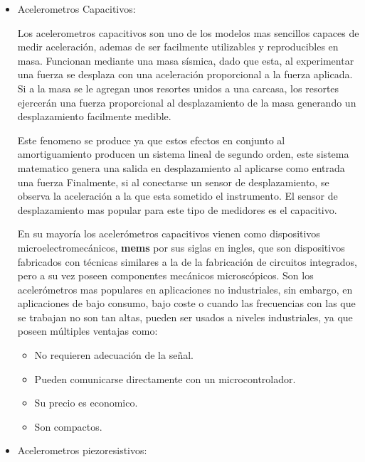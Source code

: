 \begin{itemize}
    \item  Acelerometros Capacitivos:

        Los acelerometros capacitivos son uno de los modelos mas sencillos
        capaces de medir
        aceleración, ademas de ser facilmente utilizables y reproducibles en masa.
        Funcionan mediante una masa sísmica, dado que esta, al  experimentar una fuerza
        se desplaza con una aceleración proporcional a la fuerza aplicada.
        Si a la masa se le agregan unos resortes unidos a una carcasa, los resortes
        ejercerán una fuerza proporcional al desplazamiento de la masa generando un
        desplazamiento facilmente medible.

        Este fenomeno se produce ya que estos efectos en conjunto al
        amortiguamiento producen un sistema lineal de
        segundo orden, este sistema matematico genera una salida en desplazamiento
        al aplicarse como entrada una fuerza
         Finalmente, si al conectarse un sensor de desplazamiento, se observa
        la aceleración a la que esta sometido el instrumento.
        El sensor de desplazamiento mas
        popular para este tipo de medidores es el capacitivo.

        En su mayoría los acelerómetros capacitivos vienen como dispositivos
        microelectromecánicos, \textbf{mems} por sus siglas en ingles, que son
        dispositivos
        fabricados con técnicas similares a la de la fabricación de circuitos
        integrados, pero a su vez poseen componentes mecánicos microscópicos. Son los
        acelerómetros mas populares en aplicaciones no industriales, sin embargo,
        en aplicaciones de bajo consumo, bajo coste o cuando las frecuencias con
        las que se trabajan no son tan altas, pueden ser usados a niveles
        industriales, ya que poseen múltiples ventajas como:

        \begin{itemize}
            \item No requieren adecuación de la señal.
            \item Pueden comunicarse directamente con un microcontrolador.
            \item Su precio es economico.
            \item Son compactos.
        \end{itemize}


    \item  Acelerometros piezoresistivos:


\end{itemize}
